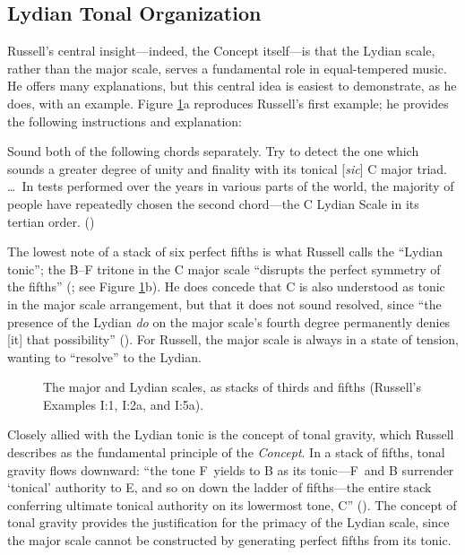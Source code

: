 \subsection{Lydian Tonal Organization}
\label{subsec:lydian-org}

Russell's central insight---indeed, the Concept itself---is that the Lydian
scale, rather than the major scale, serves a fundamental role in
equal-tempered music. He offers many explanations, but this central idea is
easiest to demonstrate, as he does, with an example. Figure
\ref{lcc:tertian-stacks}a reproduces Russell's first example; he provides the
following instructions and explanation:%
%
\begin{quoting}
  \singlespacing
  Sound both of the following chords separately. Try to detect the one which
  sounds a greater degree of unity and finality with its tonical [\emph{sic}] C
  major triad. \ldots\ In tests performed over the years in various parts of the
  world, the majority of people have repeatedly chosen the second chord---the C
  Lydian Scale in its tertian order. ()
\end{quoting}%
%
The lowest note of a stack of six perfect fifths is what Russell calls the
``Lydian tonic''; the B--F tritone in the C major scale ``disrupts the perfect
symmetry of the fifths'' (; see Figure \ref{lcc:tertian-stacks}b). He
does concede that C is also understood as tonic in the major scale
arrangement, but that it does not sound resolved, since ``the presence of the
Lydian \emph{do} on the major scale's fourth degree permanently denies [it]
that possibility'' (). For Russell, the major scale is always in a state
of tension, wanting to ``resolve'' to the Lydian.

\begin{figure}[tbp]
  \caption[The major and Lydian scales as stacks of thirds and fifths.]{%
    The major and Lydian scales, as stacks of thirds and fifths (Russell's
    Examples I:1, I:2a, and I:5a).}
  \label{lcc:tertian-stacks}
\end{figure}

Closely allied with the Lydian tonic is the concept of tonal gravity, which
Russell describes as the fundamental principle of the \emph{Concept}. In a stack of
fifths, tonal gravity flows downward: ``the tone F\sharp\ yields to B as its
tonic---F\sharp\ and B surrender `tonical' authority to E, and so on down the
ladder of fifths---the entire stack conferring ultimate tonical authority on
its lowermost tone, C'' ().  The concept of tonal gravity provides the
justification for the primacy of the Lydian scale, since the major scale
cannot be constructed by generating perfect fifths from its tonic.

